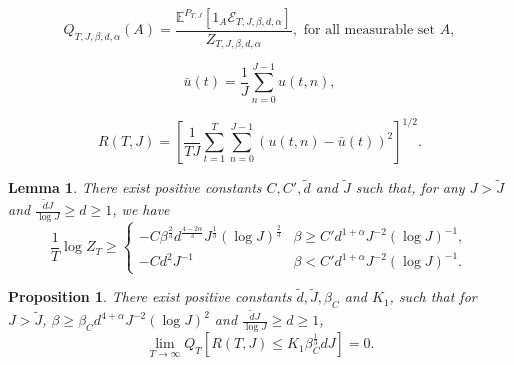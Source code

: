 \documentclass[10pt,a4paper]{amsart}
\newtheorem{lemma}{Lemma}
\newtheorem{prop}{Proposition}
\begin{document}
\begin{equation}
\label{Qmeas}
Q_{T,J,\beta,d,\alpha}(A) =\frac{ \mathbb{E}^{P_{T,J}}[1_{A}\mathcal{E}_{T,J,\beta,d,\alpha}]}{Z_{T,J,\beta,d,\alpha}}, \text{ for all measurable set $A$},
\end{equation}

\begin{equation}
\label{ubar}
\bar{u}(t) = \frac{1}{J}\sum_{n=0}^{J-1}u(t,n),
\end{equation}

\begin{equation}
\label{RTJ}
R(T,J) = \left[\frac{1}{TJ}\sum_{t=1}^T\sum_{n=0}^{J-1}(u(t,n)-\bar{u}(t))^2\right]^{1/2}.
\end{equation}

\begin{lemma}\label{ZT} There exist positive constants $C,C',\tilde{d}$ and $\tilde{J}$ such that, for any $J>\tilde{J}$ and $\frac{\tilde{d}J}{\log J}\geq d\geq 1$, we have 
    \[\frac{1}{T}\log Z_T\geq \begin{cases}
            -C\beta^{\frac{2}{3}}d^{\frac{4-2\alpha}{3}}J^{\frac{1}{3}}(\log J)^{\frac{2}{3}} & \beta\geq C'd^{1+\alpha}J^{-2}(\log J)^{-1},\\
            -Cd^2J^{-1}&\beta<C'd^{1+\alpha}J^{-2}(\log J)^{-1}.\end{cases}\]
\end{lemma}

\begin{prop}
\label{lower}
    There exist positive constants $\tilde{d}, \tilde{J}, \beta_C$ and $K_1$, such that for $J>\tilde{J}$, $\beta \geq\beta_Cd^{4+\alpha}J^{-2}(\log J)^{2}$ and $\frac{\tilde{d}J}{\log J}\geq d\geq 1$,
    \begin{equation*}
    \lim_{T\to \infty}Q_T\left[R(T,J)\leq K_1\beta_C^{\frac{1}{3}}d J\right]=0.
\end{equation*}
\end{prop}
\end{document}

